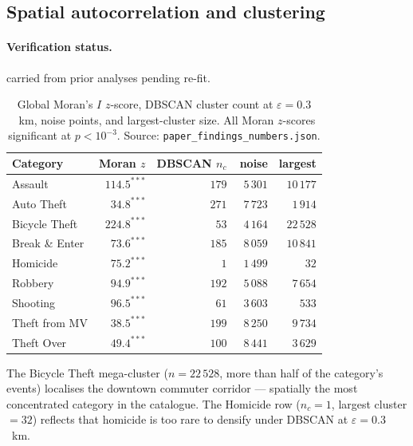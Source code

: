 \documentclass[article,shortnames,nojss]{jss}
\begin{document}
\subsection{Spatial autocorrelation and clustering}\label{phys-spatial}


\paragraph*{Verification status.}
carried from prior analyses pending re-fit.

\begin{table}[h]
\centering\footnotesize
\caption{Global Moran's $I$ $z$-score, DBSCAN cluster count at
$\varepsilon=0.3$~km, noise points, and largest-cluster size.  All
Moran $z$-scores significant at $p<10^{-3}$.  Source:
\texttt{paper\_findings\_numbers.json}.}\label{tab:spatial}
\begin{tabular}{lrrrr}
\toprule
Category & Moran $z$ & DBSCAN $n_c$ & noise & largest\\\midrule
Assault       & $114.5^{\ast\ast\ast}$ & $179$ & $\phantom{0}5\,301$ & $10\,177$\\
Auto Theft    & $\phantom{0}34.8^{\ast\ast\ast}$ & $271$ & $\phantom{0}7\,723$ & $\phantom{0}1\,914$\\
Bicycle Theft & $224.8^{\ast\ast\ast}$ & $\phantom{0}53$ & $\phantom{0}4\,164$ & $22\,528$\\
Break \& Enter& $\phantom{0}73.6^{\ast\ast\ast}$ & $185$ & $\phantom{0}8\,059$ & $10\,841$\\
Homicide      & $\phantom{0}75.2^{\ast\ast\ast}$ & $\phantom{00}1$ & $\phantom{0}1\,499$ & $\phantom{00\,0}32$\\
Robbery       & $\phantom{0}94.9^{\ast\ast\ast}$ & $192$ & $\phantom{0}5\,088$ & $\phantom{0}7\,654$\\
Shooting      & $\phantom{0}96.5^{\ast\ast\ast}$ & $\phantom{0}61$ & $\phantom{0}3\,603$ & $\phantom{0\,0}533$\\
Theft from MV & $\phantom{0}38.5^{\ast\ast\ast}$ & $199$ & $\phantom{0}8\,250$ & $\phantom{0}9\,734$\\
Theft Over    & $\phantom{0}49.4^{\ast\ast\ast}$ & $100$ & $\phantom{0}8\,441$ & $\phantom{0}3\,629$\\
\bottomrule
\end{tabular}
\end{table}

The Bicycle Theft mega-cluster ($n=22\,528$, more than half of the
category's events) localises the downtown commuter corridor ---
spatially the most concentrated category in the catalogue.  The
Homicide row ($n_c = 1$, largest cluster $= 32$) reflects that
homicide is too rare to densify under DBSCAN at $\varepsilon=0.3$~km.
\end{document}
